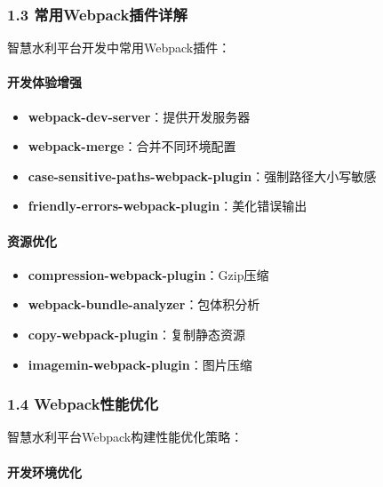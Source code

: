 \subsubsection{1.3
常用Webpack插件详解}\label{ux5e38ux7528webpackux63d2ux4ef6ux8be6ux89e3}

智慧水利平台开发中常用Webpack插件：

\paragraph{开发体验增强}\label{ux5f00ux53d1ux4f53ux9a8cux589eux5f3a}

\begin{itemize}
\tightlist
\item
  \textbf{webpack-dev-server}：提供开发服务器
\item
  \textbf{webpack-merge}：合并不同环境配置
\item
  \textbf{case-sensitive-paths-webpack-plugin}：强制路径大小写敏感
\item
  \textbf{friendly-errors-webpack-plugin}：美化错误输出
\end{itemize}

\paragraph{资源优化}\label{ux8d44ux6e90ux4f18ux5316}

\begin{itemize}
\tightlist
\item
  \textbf{compression-webpack-plugin}：Gzip压缩
\item
  \textbf{webpack-bundle-analyzer}：包体积分析
\item
  \textbf{copy-webpack-plugin}：复制静态资源
\item
  \textbf{imagemin-webpack-plugin}：图片压缩
\end{itemize}

\subsubsection{1.4
Webpack性能优化}\label{webpackux6027ux80fdux4f18ux5316}

智慧水利平台Webpack构建性能优化策略：

\paragraph{开发环境优化}\label{ux5f00ux53d1ux73afux5883ux4f18ux5316}

